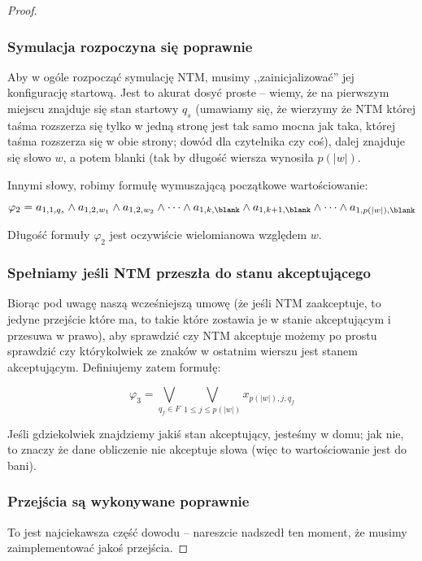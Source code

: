 \begin{proof}
    \subsubsection{Symulacja rozpoczyna się poprawnie}
        Aby w ogóle rozpocząć symulację NTM, musimy ,,zainicjalizować'' jej konfigurację startową. Jest to akurat dosyć proste -- wiemy, że na pierwszym miejscu znajduje się stan startowy \(q_s\) (umawiamy się, że wierzymy że NTM której taśma rozszerza się tylko w jedną stronę jest tak samo mocna jak taka, której taśma rozszerza się w obie strony; dowód dla czytelnika czy coś), dalej znajduje się słowo \(w\), a potem blanki (tak by długość wiersza wynosiła \(p(|w|)\). 
        
        Innymi słowy, robimy formułę wymuszającą początkowe wartościowanie:
        
        \[
            \varphi_2 = a_{1,1, q_{s}} \land a_{1,2, w_1} \land a_{1,2, w_2} \land \dots \land a_{1, k, \blank} \land a_{1, k+1, \blank} \land \dots \land a_{1, p(|w|), \blank}
        \]
    
        Długość formuły \(\varphi_2\) jest oczywiście wielomianowa względem \(w\). 
    
    \subsubsection{Spełniamy jeśli NTM przeszła do stanu akceptującego}
        Biorąc pod uwagę naszą wcześniejszą umowę (że jeśli NTM zaakceptuje, to jedyne przejście które ma, to takie które zostawia je w stanie akceptującym i przesuwa w prawo), aby sprawdzić czy NTM akceptuje możemy po prostu sprawdzić czy którykolwiek ze znaków w ostatnim wierszu jest stanem akceptującym. Definiujemy zatem formułę:
        
        \[ 
            \varphi_3 = \bigvee_{q_f \in F } \bigvee_{1 \leq j \leq p(|w|)} x_{p(|w|), j, q_f}
        \]
        
        Jeśli gdziekolwiek znajdziemy jakiś stan akceptujący, jesteśmy w domu; jak nie, to znaczy że dane obliczenie nie akceptuje słowa (więc to wartościowanie jest do bani).
    
    \subsubsection{Przejścia są wykonywane poprawnie}
        To jest najciekawsza część dowodu -- nareszcie nadszedł ten moment, że musimy zaimplementować jakoś przejścia. 
        

\end{proof}
